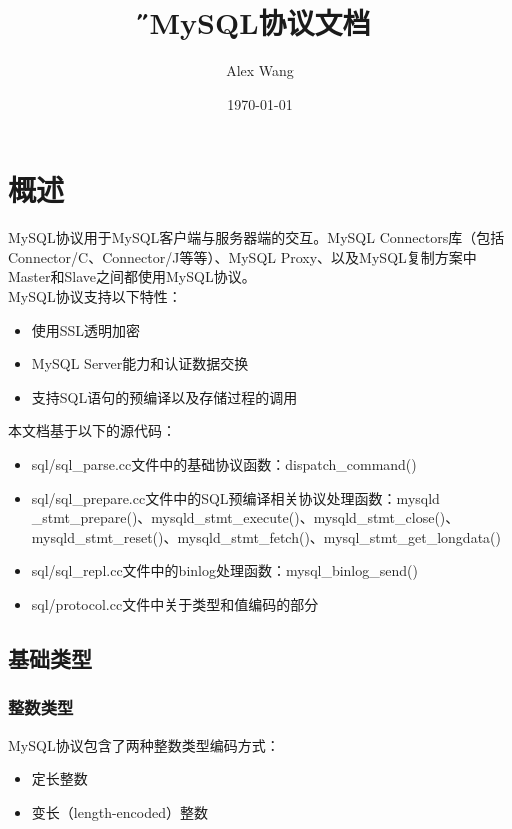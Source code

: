 \documentclass[a4paper, titlepage, 10pt, bookmark]{article}
\title{\H \color{gray}MySQL协议文档}
\author{\color{gray}Alex Wang}
\date{\E\color{gray}\today}
\begin{document}
\setcounter{secnumdepth}{6}
\setcounter{tocdepth}{5}
\maketitle

\color{darkgray}
\tableofcontents
\newpage








\section{概述}
MySQL协议用于MySQL客户端与服务器端的交互。MySQL Connectors库（包括Connector/C、Connector/J等等）、MySQL Proxy、以及MySQL复制方案中Master和Slave之间都使用MySQL协议。\\

MySQL协议支持以下特性：
\begin{itemize}
    \item 使用SSL透明加密
    \item MySQL Server能力和认证数据交换
    \item 支持SQL语句的预编译以及存储过程的调用
\end{itemize}

本文档基于以下的源代码：
\begin{itemize}
    \item sql/sql\_parse.cc文件中的基础协议函数：dispatch\_command()
    \item sql/sql\_prepare.cc文件中的SQL预编译相关协议处理函数：mysqld
    \_stmt\_prepare()、mysqld\_stmt\_execute()、mysqld\_stmt\_close()、mysqld\_stmt\_reset()、mysqld\_stmt\_fetch()、mysql\_stmt\_get\_longdata() 
    \item sql/sql\_repl.cc文件中的binlog处理函数：mysql\_binlog\_send()
    \item sql/protocol.cc文件中关于类型和值编码的部分
\end{itemize}

\subsection{基础类型}
\subsubsection{整数类型}
MySQL协议包含了两种整数类型编码方式：
\begin{itemize}
    \item 定长整数
    \item 变长（length-encoded）整数
\end{itemize}
\end{document}
